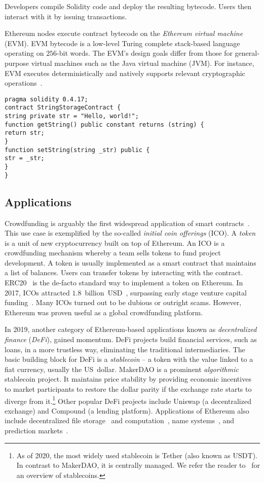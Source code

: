 Developers compile Solidity code and deploy the resulting bytecode.
Users then interact with it by issuing transactions.

Ethereum nodes execute contract bytecode on the \textit{Ethereum virtual machine} (EVM).
EVM bytecode is a low-level Turing complete stack-based language operating on $256$-bit words.
The EVM's design goals differ from those for general-purpose virtual machines such as the Java virtual machine (JVM).
For instance, EVM executes deterministically and natively supports relevant cryptographic operations~\cite{Buterin2017}.

\begin{lstlisting}[language=Solidity, label={lst:SolidityExample}, caption=A simple contract in Solidity]
pragma solidity 0.4.17;
contract StringStorageContract {
string private str = "Hello, world!";
function getString() public constant returns (string) {
return str;
}
function setString(string _str) public {
str = _str;
}
}
\end{lstlisting}


\subsection{Applications}

Crowdfunding is arguably the first widespread application of smart contracts~\cite{McAdams2017}.
This use case is exemplified by the so-called \textit{initial coin offerings} (ICO).
A \textit{token} is a unit of new cryptocurrency built on top of Ethereum.
An ICO is a crowdfunding mechanism whereby a team sells tokens to fund project development.
A token is usually implemented as a smart contract that maintains a list of balances.
Users can transfer tokens by interacting with the contract.
ERC20~\cite{Victor2019} is the de-facto standard way to implement a token on Ethereum.
In 2017, ICOs attracted $1.8$~billion~USD~\cite{CoindeakICOTracker}, surpassing early stage venture capital funding~\cite{Sunnarborg2017}.
Many ICOs turned out to be dubious or outright scams.
However, Ethereum was proven useful as a global crowdfunding platform.

In 2019, another category of Ethereum-based applications known as \textit{decentralized finance} (\textit{DeFi}), gained momentum.
DeFi projects build financial services, such as loans, in a more trustless way, eliminating the traditional intermediaries.
The basic building block for DeFi is a \textit{stablecoin} -- a token with the value linked to a fiat currency, usually the US~dollar.
MakerDAO is a prominent \textit{algorithmic} stablecoin project.
It maintains price stability by providing economic incentives to market participants to restore the dollar parity if the exchange rate starts to diverge from it.\footnote{As of 2020, the most widely used stablecoin is Tether (also known as USDT). In contrast to MakerDAO, it is centrally managed. We refer the reader to~\cite{Clark2020,KlagesMundt2020} for an overview of stablecoins.}
Other popular DeFi projects include Uniswap (a decentralized exchange) and Compound (a lending platform).
Applications of Ethereum also include decentralized file storage~\cite{Storj} and computation~\cite{Golem}, name systems~\cite{ENS}, and prediction markets~\cite{Augur, Gnosis}.


